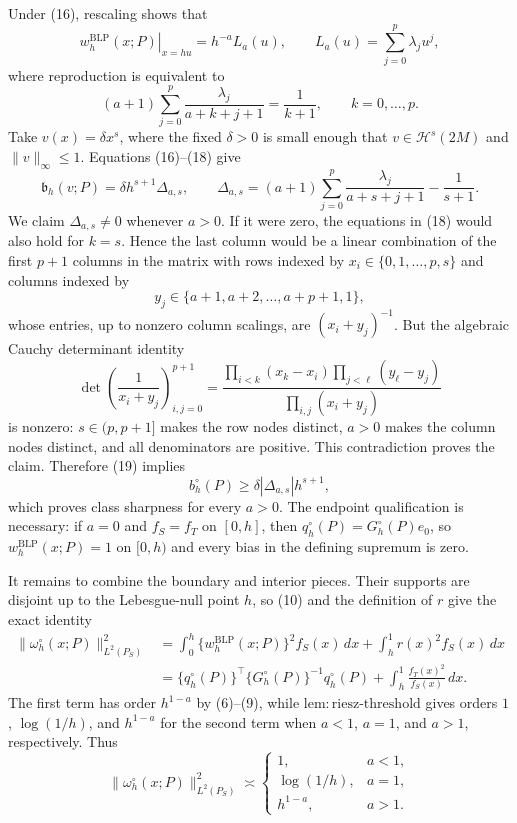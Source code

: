 Under (16), rescaling shows that
\[
\left.w_h^{\mathrm{BLP}}(x;P)\right|_{x=hu}=h^{-a}L_a(u),
\qquad
L_a(u)=\sum_{j=0}^p\lambda_ju^j,
\tag{17}
\]
where reproduction is equivalent to
\[
(a+1)\sum_{j=0}^p\frac{\lambda_j}{a+k+j+1}=\frac1{k+1},
\qquad k=0,\ldots,p.
\tag{18}
\]
Take \(v(x)=\delta x^s\), where the fixed \(\delta>0\) is small enough that
\(v\in\mathcal H^s(2M)\) and \(\|v\|_\infty\le1\). Equations (16)--(18) give
\[
\mathfrak b_h(v;P)=\delta h^{s+1}\Delta_{a,s},
\qquad
\Delta_{a,s}=(a+1)\sum_{j=0}^p\frac{\lambda_j}{a+s+j+1}-\frac1{s+1}.
\tag{19}
\]
We claim \(\Delta_{a,s}\ne0\) whenever \(a>0\). If it were zero, the equations in (18) would also hold for \(k=s\). Hence the last column would be a linear combination of the first \(p+1\) columns in the matrix with rows indexed by \(x_i\in\{0,1,\ldots,p,s\}\) and columns indexed by
\[
y_j\in\{a+1,a+2,\ldots,a+p+1,1\},
\]
whose entries, up to nonzero column scalings, are \((x_i+y_j)^{-1}\). But the algebraic Cauchy determinant identity
\[
\det\left(\frac1{x_i+y_j}\right)_{i,j=0}^{p+1}
=
\frac{\prod_{i<k}(x_k-x_i)\prod_{j<\ell}(y_\ell-y_j)}
{\prod_{i,j}(x_i+y_j)}
\tag{20}
\]
is nonzero: \(s\in(p,p+1]\) makes the row nodes distinct, \(a>0\) makes the column nodes distinct, and all denominators are positive. This contradiction proves the claim. Therefore (19) implies
\[
b_h^{\circ}(P)\ge\delta|\Delta_{a,s}|h^{s+1},
\tag{21}
\]
which proves class sharpness for every \(a>0\). The endpoint qualification is necessary: if \(a=0\) and \(f_S=f_T\) on \([0,h]\), then \(q_h^{\circ}(P)=G_h^{\circ}(P)e_0\), so \(w_h^{\mathrm{BLP}}(x;P)=1\) on \([0,h)\) and every bias in the defining supremum is zero.

It remains to combine the boundary and interior pieces. Their supports are disjoint up to the Lebesgue-null point \(h\), so (10) and the definition of \(r\) give the exact identity
\[
\begin{aligned}
\|\omega_h^{\circ}(x;P)\|_{L^2(P_S)}^2
&=\int_0^h\{w_h^{\mathrm{BLP}}(x;P)\}^2f_S(x)\,dx
  +\int_h^1r(x)^2f_S(x)\,dx\\
&=\{q_h^{\circ}(P)\}^\top\{G_h^{\circ}(P)\}^{-1}q_h^{\circ}(P)
  +\int_h^1\frac{f_T(x)^2}{f_S(x)}\,dx.
\end{aligned}
\tag{22}
\]
The first term has order \(h^{1-a}\) by (6)--(9), while
\(\mathrm{lem:riesz\text{-}threshold}\) gives orders \(1\), \(\log(1/h)\), and
\(h^{1-a}\) for the second term when \(a<1\), \(a=1\), and \(a>1\), respectively. Thus
\[
\|\omega_h^{\circ}(x;P)\|_{L^2(P_S)}^2\asymp
\begin{cases}
1,&a<1,\\
\log(1/h),&a=1,\\
h^{1-a},&a>1.
\end{cases}
\tag{23}
\]

